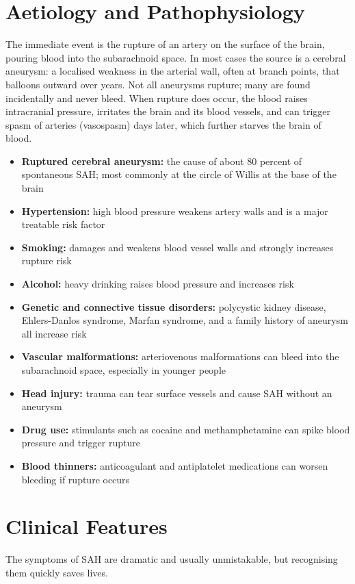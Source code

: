 \section*{Aetiology and Pathophysiology}
The immediate event is the rupture of an artery on the surface of the brain, pouring blood into the subarachnoid space. In most cases the source is a cerebral aneurysm: a localised weakness in the arterial wall, often at branch points, that balloons outward over years. Not all aneurysms rupture; many are found incidentally and never bleed. When rupture does occur, the blood raises intracranial pressure, irritates the brain and its blood vessels, and can trigger spasm of arteries (vasospasm) days later, which further starves the brain of blood.

\begin{itemize}
    \item \textbf{Ruptured cerebral aneurysm:} the cause of about 80 percent of spontaneous SAH; most commonly at the circle of Willis at the base of the brain
    \item \textbf{Hypertension:} high blood pressure weakens artery walls and is a major treatable risk factor
    \item \textbf{Smoking:} damages and weakens blood vessel walls and strongly increases rupture risk
    \item \textbf{Alcohol:} heavy drinking raises blood pressure and increases risk
    \item \textbf{Genetic and connective tissue disorders:} polycystic kidney disease, Ehlers-Danlos syndrome, Marfan syndrome, and a family history of aneurysm all increase risk
    \item \textbf{Vascular malformations:} arteriovenous malformations can bleed into the subarachnoid space, especially in younger people
    \item \textbf{Head injury:} trauma can tear surface vessels and cause SAH without an aneurysm
    \item \textbf{Drug use:} stimulants such as cocaine and methamphetamine can spike blood pressure and trigger rupture
    \item \textbf{Blood thinners:} anticoagulant and antiplatelet medications can worsen bleeding if rupture occurs
\end{itemize}

\section*{Clinical Features}
The symptoms of SAH are dramatic and usually unmistakable, but recognising them quickly saves lives.


